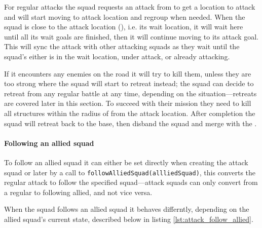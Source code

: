 For regular attacks the squad requests an attack from  to get a location to attack and will start moving to attack location and regroup when needed. When the squad is close to the attack location (\squadAttackWaitingPositionDistanceFromGoal), i.e. its wait location, it will wait here until all its wait goals are finished, then it will continue moving to its attack goal. This will sync the attack with other attacking squads as they wait until the squad's either is in the wait location, under attack, or already attacking.

If it encounters any enemies on the road it will try to kill them, unless they are too strong where the squad will start to retreat instead; the squad can decide to retreat from any regular battle at any time, depending on the situation—retreats are covered later in this section. To succeed with their mission they need to kill all structures within the radius of \squadAttackStructuresDestroyedGoalDistance from the attack location. After completion the squad will retreat back to the base, then disband the squad and merge with the .

\paragraph{Following an allied squad}
To follow an allied squad it can either be set directly when creating the attack squad or later by a call to \texttt{followAlliedSquad(allliedSquad)}, this converts the regular attack to follow the specified squad—attack squads can only convert from a regular to following allied, and not vice versa.

When the squad follows an allied squad it behaves differntly, depending on the allied squad's current state, described below in listing \ref{lst:attack_follow_allied}.

